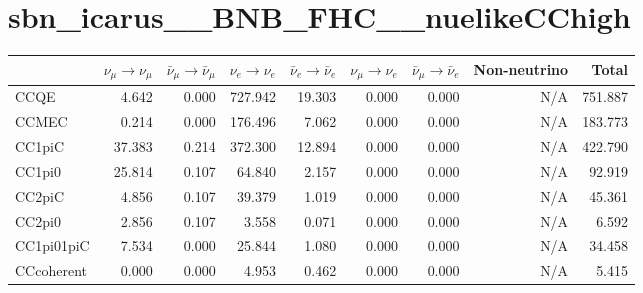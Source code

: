 \newpage
\begin{table}
\section*{sbn\_icarus\_\_BNB\_FHC\_\_nuelikeCChigh}
\begin{adjustbox}{width=1\textwidth}
\begin{tabular} {l r r r r r r r r}
\hline
              & $\nu_{\mu} \rightarrow \nu_{\mu}$ & $\bar{\nu}_{\mu} \rightarrow \bar{\nu}_{\mu}$ & $\nu_{e} \rightarrow \nu_{e}$ & $\bar{\nu}_{e} \rightarrow \bar{\nu}_{e}$ & $\nu_{\mu} \rightarrow \nu_{e}$ & $\bar{\nu}_{\mu} \rightarrow \bar{\nu}_{e}$ & Non-neutrino         & Total                \\ \hline\hline
 CCQE         & 4.642                & 0.000                & 727.942              & 19.303               & 0.000                & 0.000                & N/A                  & 751.887      
        \\ \hline
 CCMEC        & 0.214                & 0.000                & 176.496              & 7.062                & 0.000                & 0.000                & N/A                  & 183.773      
        \\ \hline
 CC1piC       & 37.383               & 0.214                & 372.300              & 12.894               & 0.000                & 0.000                & N/A                  & 422.790      
        \\ \hline
 CC1pi0       & 25.814               & 0.107                & 64.840               & 2.157                & 0.000                & 0.000                & N/A                  & 92.919       
        \\ \hline
 CC2piC       & 4.856                & 0.107                & 39.379               & 1.019                & 0.000                & 0.000                & N/A                  & 45.361       
        \\ \hline
 CC2pi0       & 2.856                & 0.107                & 3.558                & 0.071                & 0.000                & 0.000                & N/A                  & 6.592        
        \\ \hline
 CC1pi01piC   & 7.534                & 0.000                & 25.844               & 1.080                & 0.000                & 0.000                & N/A                  & 34.458       
        \\ \hline
 CCcoherent   & 0.000                & 0.000                & 4.953                & 0.462                & 0.000                & 0.000                & N/A                  & 5.415        

\end{tabular}
\end{adjustbox}
\end{table}
